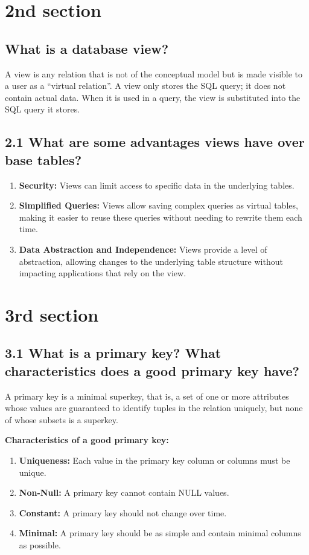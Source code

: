 \documentclass[12pt]{article}
\begin{document}
\section{2nd section}
\subsection*{What is a database view?}

A view is any relation that is not of the conceptual model but is made visible to a user as a ``virtual relation''. A view only stores the SQL query; it does not contain actual data. When it is used in a query, the view is substituted into the SQL query it stores.
\subsection*{2.1 What are some advantages views have over base tables?}

\begin{enumerate}
    \item \textbf{Security:} Views can limit access to specific data in the underlying tables.
    \item \textbf{Simplified Queries:} Views allow saving complex queries as virtual tables, making it easier to reuse these queries without needing to rewrite them each time.
    \item \textbf{Data Abstraction and Independence:} Views provide a level of abstraction, allowing changes to the underlying table structure without impacting applications that rely on the view.
\end{enumerate}

\section{3rd section}
\subsection*{3.1 What is a primary key? What characteristics does a good primary key have?}

A primary key is a minimal superkey, that is, a set of one or more attributes whose values are guaranteed to identify tuples in the relation uniquely, but none of whose subsets is a superkey.

\textbf{Characteristics of a good primary key:}
\begin{enumerate}
    \item \textbf{Uniqueness:} Each value in the primary key column or columns must be unique.
    \item \textbf{Non-Null:} A primary key cannot contain NULL values.
    \item \textbf{Constant:} A primary key should not change over time.
    \item \textbf{Minimal:} A primary key should be as simple and contain minimal columns as possible.
\end{enumerate}
\newpage
\end{document}
